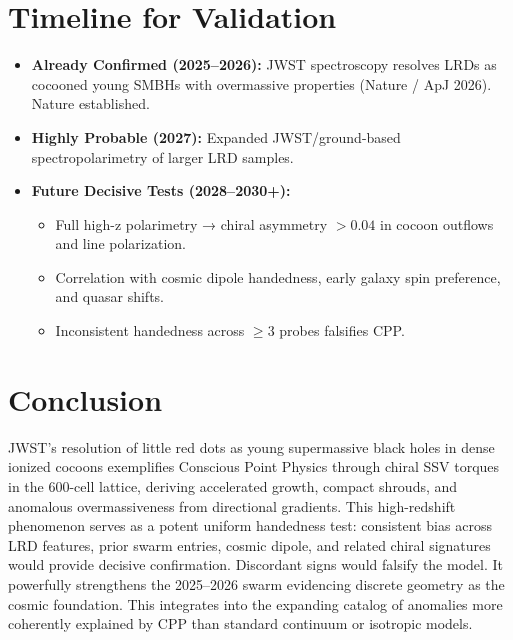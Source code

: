 \documentclass[11pt]{article}
\begin{document}
\section{Timeline for Validation}
\begin{itemize}
    \item \textbf{Already Confirmed (2025--2026):} JWST spectroscopy resolves LRDs as cocooned young SMBHs with overmassive properties (Nature / ApJ 2026). Nature established.
    \item \textbf{Highly Probable (2027):} Expanded JWST/ground-based spectropolarimetry of larger LRD samples.
    \item \textbf{Future Decisive Tests (2028--2030+):}
    \begin{itemize}
        \item Full high-z polarimetry → chiral asymmetry $>0.04$ in cocoon outflows and line polarization.
        \item Correlation with cosmic dipole handedness, early galaxy spin preference, and quasar shifts.
        \item Inconsistent handedness across $\geq 3$ probes falsifies CPP.
    \end{itemize}
\end{itemize}

\section{Conclusion}
JWST's resolution of little red dots as young supermassive black holes in dense ionized cocoons exemplifies Conscious Point Physics through chiral SSV torques in the 600-cell lattice, deriving accelerated growth, compact shrouds, and anomalous overmassiveness from directional gradients.  
This high-redshift phenomenon serves as a potent uniform handedness test: consistent bias across LRD features, prior swarm entries, cosmic dipole, and related chiral signatures would provide decisive confirmation. Discordant signs would falsify the model. It powerfully strengthens the 2025--2026 swarm evidencing discrete geometry as the cosmic foundation.  
This integrates into the expanding catalog of anomalies more coherently explained by CPP than standard continuum or isotropic models.
\end{document}
